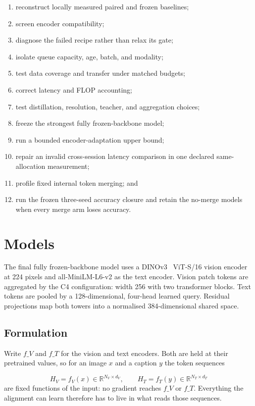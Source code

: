 \documentclass[11pt,a4paper,oneside]{report}
\begin{document}
\begin{enumerate}
\item reconstruct locally measured paired and frozen baselines;
\item screen encoder compatibility;
\item diagnose the failed recipe rather than relax its gate;
\item isolate queue capacity, age, batch, and modality;
\item test data coverage and transfer under matched budgets;
\item correct latency and FLOP accounting;
\item test distillation, resolution, teacher, and aggregation choices;
\item freeze the strongest fully frozen-backbone model;
\item run a bounded encoder-adaptation upper bound;
\item repair an invalid cross-session latency comparison in one declared same-allocation measurement;
\item profile fixed internal token merging; and
\item run the frozen three-seed accuracy closure and retain the no-merge models when every merge arm loses accuracy.
\end{enumerate}
\section{Models}
The final fully frozen-backbone model uses a DINOv3~\cite{simeoni2025dinov3} ViT-S/16 vision encoder at 224 pixels and all-MiniLM-L6-v2 as the text encoder. Vision patch tokens are aggregated by the C4 configuration: width 256 with two transformer blocks. Text tokens are pooled by a 128-dimensional, four-head learned query. Residual projections map both towers into a normalised 384-dimensional shared space.

\subsection{Formulation}
Write $f\_V$ and $f\_T$ for the vision and text encoders. Both are held at their pretrained values, so for an image $x$ and a caption $y$ the token sequences

\begin{equation*}
H_V = f_V(x) \in \mathbb{R}^{N_V \times d_V},
\qquad
H_T = f_T(y) \in \mathbb{R}^{N_T \times d_T}
\end{equation*}
are fixed functions of the input: no gradient reaches $f\_V$ or $f\_T$. Everything the alignment can learn therefore has to live in what reads those sequences.
\end{document}
